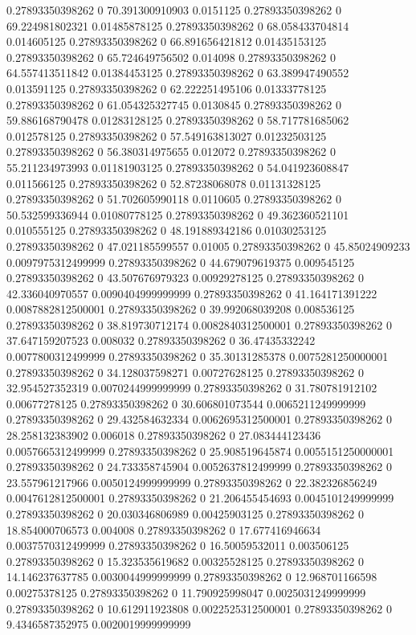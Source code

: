 0.27893350398262 0 70.391300910903 0.0151125
0.27893350398262 0 69.224981802321 0.01485878125
0.27893350398262 0 68.058433704814 0.014605125
0.27893350398262 0 66.891656421812 0.01435153125
0.27893350398262 0 65.724649756502 0.014098
0.27893350398262 0 64.557413511842 0.01384453125
0.27893350398262 0 63.389947490552 0.013591125
0.27893350398262 0 62.222251495106 0.01333778125
0.27893350398262 0 61.054325327745 0.0130845
0.27893350398262 0 59.886168790478 0.01283128125
0.27893350398262 0 58.717781685062 0.012578125
0.27893350398262 0 57.549163813027 0.01232503125
0.27893350398262 0 56.380314975655 0.012072
0.27893350398262 0 55.211234973993 0.01181903125
0.27893350398262 0 54.041923608847 0.011566125
0.27893350398262 0 52.87238068078 0.01131328125
0.27893350398262 0 51.702605990118 0.0110605
0.27893350398262 0 50.532599336944 0.01080778125
0.27893350398262 0 49.362360521101 0.010555125
0.27893350398262 0 48.191889342186 0.01030253125
0.27893350398262 0 47.021185599557 0.01005
0.27893350398262 0 45.85024909233 0.0097975312499999
0.27893350398262 0 44.679079619375 0.009545125
0.27893350398262 0 43.507676979323 0.00929278125
0.27893350398262 0 42.336040970557 0.0090404999999999
0.27893350398262 0 41.164171391222 0.0087882812500001
0.27893350398262 0 39.992068039208 0.008536125
0.27893350398262 0 38.819730712174 0.0082840312500001
0.27893350398262 0 37.647159207523 0.008032
0.27893350398262 0 36.47435332242 0.0077800312499999
0.27893350398262 0 35.30131285378 0.0075281250000001
0.27893350398262 0 34.128037598271 0.00727628125
0.27893350398262 0 32.954527352319 0.0070244999999999
0.27893350398262 0 31.780781912102 0.00677278125
0.27893350398262 0 30.606801073544 0.0065211249999999
0.27893350398262 0 29.432584632334 0.0062695312500001
0.27893350398262 0 28.258132383902 0.006018
0.27893350398262 0 27.083444123436 0.0057665312499999
0.27893350398262 0 25.908519645874 0.0055151250000001
0.27893350398262 0 24.733358745904 0.0052637812499999
0.27893350398262 0 23.557961217966 0.0050124999999999
0.27893350398262 0 22.382326856249 0.0047612812500001
0.27893350398262 0 21.206455454693 0.0045101249999999
0.27893350398262 0 20.030346806989 0.00425903125
0.27893350398262 0 18.854000706573 0.004008
0.27893350398262 0 17.677416946634 0.0037570312499999
0.27893350398262 0 16.50059532011 0.003506125
0.27893350398262 0 15.323535619682 0.00325528125
0.27893350398262 0 14.146237637785 0.0030044999999999
0.27893350398262 0 12.968701166598 0.00275378125
0.27893350398262 0 11.790925998047 0.0025031249999999
0.27893350398262 0 10.612911923808 0.0022525312500001
0.27893350398262 0 9.4346587352975 0.0020019999999999
